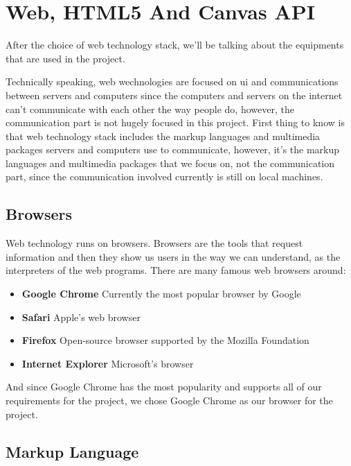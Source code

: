 
\section{Web, HTML5 And Canvas API}

After the choice of web technology stack, we'll be talking about the equipments that are used in the project.

Technically speaking, web wechnologies are focused on \gls{ui} and communications between servers and computers since the computers and servers on the internet can't communicate with each other the way people do, however, the communication part is not hugely focused in this project. First thing to know is that web technology stack includes the markup languages and multimedia packages servers and computers use to communicate, however, it's the markup languages and multimedia packages that we focus on, not the communication part, since the communication involved currently is still on local machines.

\subsection{Browsers}

Web technology runs on browsers. Browsers are the tools that request information and then they show us users in the way we can understand, as the interpreters of the web programs. There are many famous web browsers around:

\begin{itemize}
    \item \textbf{Google Chrome} Currently the most popular browser by Google
    \item \textbf{Safari} Apple's web browser
    \item \textbf{Firefox} Open-source browser supported by the Mozilla Foundation
    \item \textbf{Internet Explorer} Microsoft's browser
\end{itemize}

And since Google Chrome has the most popularity and supports all of our requirements for the project, we chose Google Chrome as our browser for the project.

\subsection{Markup Language}

